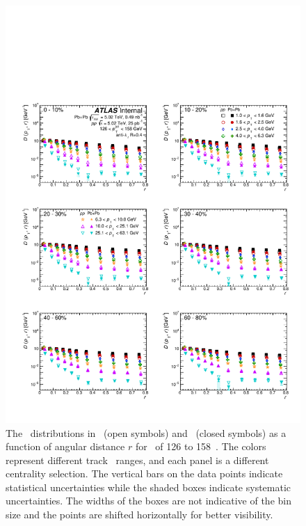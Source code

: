 \begin{figure}[h]
\centerline{
            \includegraphics[width=1\textwidth]{figures/main/results/DpT_dR_jet7.pdf} 
      }
\caption{The \Dptr\ distributions in \pp\ (open symbols) and \pbpb\ (closed symbols) as a function of angular distance $r$ for \ptjet\ of 126 to 158~\GeV. The colors represent different track \pt\ ranges, and each panel is a different centrality selection. The vertical bars on the data points indicate statistical uncertainties while the shaded boxes indicate systematic uncertainties. The widths of the boxes are not indicative of the bin size and the points are shifted horizontally for better visibility.}
\label{fig:dptr}
\end{figure}


